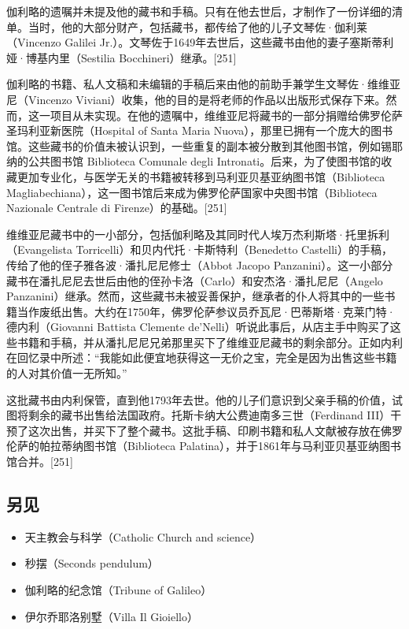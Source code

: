 伽利略的遗嘱并未提及他的藏书和手稿。只有在他去世后，才制作了一份详细的清单。当时，他的大部分财产，包括藏书，都传给了他的儿子文琴佐·伽利莱（Vincenzo Galilei Jr.）。文琴佐于1649年去世后，这些藏书由他的妻子塞斯蒂利娅·博基内里（Sestilia Bocchineri）继承。[251]  

伽利略的书籍、私人文稿和未编辑的手稿后来由他的前助手兼学生文琴佐·维维亚尼（Vincenzo Viviani）收集，他的目的是将老师的作品以出版形式保存下来。然而，这一项目从未实现。在他的遗嘱中，维维亚尼将藏书的一部分捐赠给佛罗伦萨圣玛利亚新医院（Hospital of Santa Maria Nuova），那里已拥有一个庞大的图书馆。这些藏书的价值未被认识到，一些重复的副本被分散到其他图书馆，例如锡耶纳的公共图书馆 Biblioteca Comunale degli Intronati。后来，为了使图书馆的收藏更加专业化，与医学无关的书籍被转移到马利亚贝基亚纳图书馆（Biblioteca Magliabechiana），这一图书馆后来成为佛罗伦萨国家中央图书馆（Biblioteca Nazionale Centrale di Firenze）的基础。[251]  

维维亚尼藏书中的一小部分，包括伽利略及其同时代人埃万杰利斯塔·托里拆利（Evangelista Torricelli）和贝内代托·卡斯特利（Benedetto Castelli）的手稿，传给了他的侄子雅各波·潘扎尼尼修士（Abbot Jacopo Panzanini）。这一小部分藏书在潘扎尼尼去世后由他的侄孙卡洛（Carlo）和安杰洛·潘扎尼尼（Angelo Panzanini）继承。然而，这些藏书未被妥善保护，继承者的仆人将其中的一些书籍当作废纸出售。大约在1750年，佛罗伦萨参议员乔瓦尼·巴蒂斯塔·克莱门特·德内利（Giovanni Battista Clemente de'Nelli）听说此事后，从店主手中购买了这些书籍和手稿，并从潘扎尼尼兄弟那里买下了维维亚尼藏书的剩余部分。正如内利在回忆录中所述：“我能如此便宜地获得这一无价之宝，完全是因为出售这些书籍的人对其价值一无所知。”  

这批藏书由内利保管，直到他1793年去世。他的儿子们意识到父亲手稿的价值，试图将剩余的藏书出售给法国政府。托斯卡纳大公费迪南多三世（Ferdinand III）干预了这次出售，并买下了整个藏书。这批手稿、印刷书籍和私人文献被存放在佛罗伦萨的帕拉蒂纳图书馆（Biblioteca Palatina），并于1861年与马利亚贝基亚纳图书馆合并。[251]  
\subsection{另见}  
\begin{itemize}
\item  天主教会与科学（Catholic Church and science）  
\item 秒摆（Seconds pendulum）  
\item 伽利略的纪念馆（Tribune of Galileo）  
\item 伊尔乔耶洛别墅（Villa Il Gioiello）
\end{itemize}  

